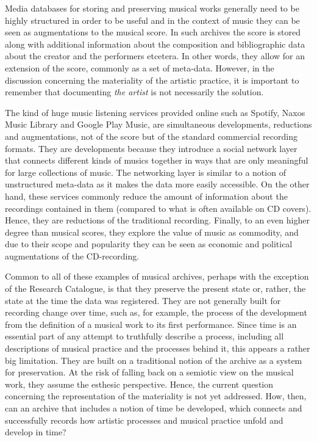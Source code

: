 Media databases for storing and preserving musical works generally need
to be highly structured in order to be useful and in the context of
music they can be seen as augmentations to the musical score. In such
archives the score is stored along with additional information about the
composition and bibliographic data about the creator and the performers
etcetera. In other words, they allow for an extension of the score,
commonly as a set of meta-data. However, in the discussion concerning
the materiality of the artistic practice, it is important to remember
that documenting \emph{the artist} is not necessarily the solution.

The kind of huge music listening services provided online such as
Spotify, Naxos Music Library and Google Play Music, are simultaneous
developments, reductions and augmentations, not of the score but of the
standard commercial recording formats. They are developments because
they introduce a social network layer that connects different kinds of
musics together in ways that are only meaningful for large collections
of music. The networking layer is similar to a notion of unstructured
meta-data as it makes the data more easily accessible. On the other
hand, these services commonly reduce the amount of information about the
recordings contained in them (compared to what is often available on CD
covers). Hence, they are reductions of the traditional recording.
Finally, to an even higher degree than musical scores, they explore the
value of music as commodity, and due to their scope and popularity they
can be seen as economic and political augmentations of the CD-recording.

Common to all of these examples of musical archives, perhaps with the
exception of the Research Catalogue, is that they preserve the present
state or, rather, the state at the time the data was registered. They
are not generally built for recording change over time, such as, for
example, the process of the development from the definition of a musical
work to its first performance. Since time is an essential part of any
attempt to truthfully describe a process, including all descriptions of
musical practice and the processes behind it, this appears a rather big
limitation. They are built on a traditional notion of the archive as a
system for preservation. At the risk of falling back on a semiotic view
on the musical work, they assume the esthesic perspective. Hence, the
current question concerning the representation of the materiality is not
yet addressed. How, then, can an archive that includes a notion of time
be developed, which connects and successfully records how artistic
processes and musical practice unfold and develop in time?

